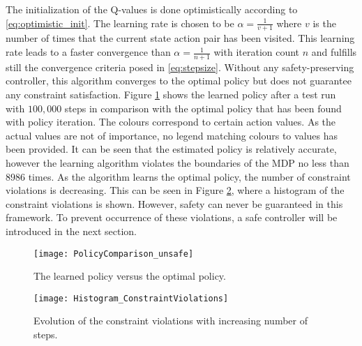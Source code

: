 \documentclass[../main.tex]{subfiles}
\begin{document}
The initialization of the Q-values is done optimistically according to \eqref{eq:optimistic_init}. The learning rate is chosen to be $\alpha = \frac{1}{v+1}$ where $v$ is the number of times that the current state action pair has been visited. This learning rate leads to a faster convergence than $\alpha = \frac{1}{n+1}$ with iteration count $n$ and fulfills still the convergence criteria posed in \eqref{eq:stepsize}. Without any safety-preserving controller, this algorithm converges to the optimal policy but does not guarantee any constraint satisfaction. Figure \ref{fig:PolicyComparison_unsafe} shows the learned policy after a test run with $100,000$ steps in comparison with the optimal policy that has been found with policy iteration. The colours correspond to certain action values. As the actual values are not of importance, no legend matching colours to values has been provided. It can be seen that the estimated policy is relatively accurate, however the learning algorithm violates the boundaries of the MDP no less than $8986$ times. As the algorithm learns the optimal policy, the number of constraint violations is decreasing. This can be seen in Figure \ref{fig:Histogram_ConstraintViolations}, where a histogram of the constraint violations is shown. However, safety can never be guaranteed in this framework. To prevent occurrence of these violations, a safe controller will be introduced in the next section.


\begin{figure}[H]
    \centering
    \texttt{[image: PolicyComparison\_unsafe]}
        \caption{The learned policy versus the optimal policy.}    
    \label{fig:PolicyComparison_unsafe}
\end{figure}
\begin{figure}[H]
    \centering
    \texttt{[image: Histogram\_ConstraintViolations]}
        \caption{Evolution of the constraint violations with increasing number of steps.}    
    \label{fig:Histogram_ConstraintViolations}
\end{figure}
\end{document}
